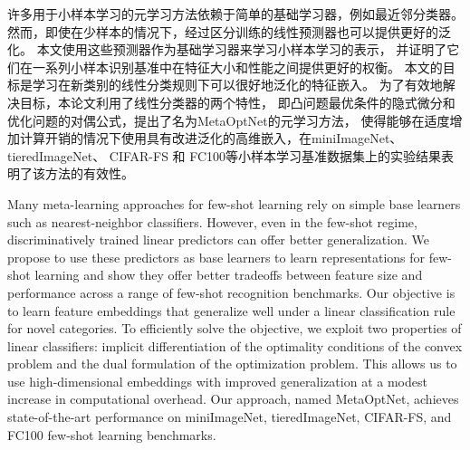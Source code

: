 
\begin{cabstract}
    许多用于小样本学习的元学习方法依赖于简单的基础学习器，例如最近邻分类器。
    然而，即使在少样本的情况下，经过区分训练的线性预测器也可以提供更好的泛化。
    本文使用这些预测器作为基础学习器来学习小样本学习的表示，
    并证明了它们在一系列小样本识别基准中在特征大小和性能之间提供更好的权衡。
    本文的目标是学习在新类别的线性分类规则下可以很好地泛化的特征嵌入。
    为了有效地解决目标，本论文利用了线性分类器的两个特性，
    即凸问题最优条件的隐式微分和优化问题的对偶公式，提出了名为MetaOptNet的元学习方法，
    使得能够在适度增加计算开销的情况下使用具有改进泛化的高维嵌入，在miniImageNet、tieredImageNet、
    CIFAR-FS 和 FC100等小样本学习基准数据集上的实验结果表明了该方法的有效性。

\end{cabstract}

\begin{eabstract}
    Many meta-learning approaches for few-shot learning rely on 
    simple base learners such as nearest-neighbor classifiers.
     However, even in the few-shot regime, discriminatively trained linear predictors can offer better generalization. 
     We propose to use these predictors as base learners to learn representations for 
     few-shot learning and show they offer better tradeoffs between feature size and 
     performance across a range of few-shot recognition benchmarks. 
     Our objective is to learn feature embeddings that generalize well under a 
     linear classification rule for novel categories. To efficiently solve the objective, 
     we exploit two properties of linear classifiers: implicit differentiation of the optimality 
     conditions of the convex problem and the dual formulation of the optimization problem. 
     This allows us to use high-dimensional embeddings with improved generalization at a modest increase 
     in computational overhead. Our approach, named MetaOptNet, achieves state-of-the-art performance on 
     miniImageNet, tieredImageNet, CIFAR-FS, and FC100 few-shot learning benchmarks.
\end{eabstract}